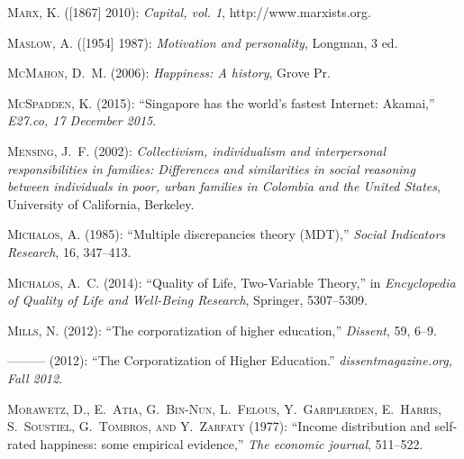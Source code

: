 \documentclass[10pt, letterpaper]{article}
\begin{document}
\begin{spacing}{2}
\begin{thebibliography}{120}
\textsc{Marx, K.} ([1867] 2010): \emph{Capital, vol. 1},
  http://www.marxists.org.

\textsc{Maslow, A.} ([1954] 1987): \emph{{Motivation and personality}},
  Longman, 3 ed.

\textsc{McMahon, D.~M.} (2006): \emph{Happiness: A history}, Grove Pr.

\textsc{McSpadden, K.} (2015): \enquote{Singapore has the world's fastest
  Internet: Akamai,} \emph{E27.co, 17 December 2015}.

\textsc{Mensing, J.~F.} (2002): \emph{Collectivism, individualism and
  interpersonal responsibilities in families: Differences and similarities in
  social reasoning between individuals in poor, urban families in Colombia and
  the United States}, University of California, Berkeley.

\textsc{Michalos, A.} (1985): \enquote{Multiple discrepancies theory (MDT),}
  \emph{Social Indicators Research}, 16, 347--413.

\textsc{Michalos, A.~C.} (2014): \enquote{Quality of Life, Two-Variable
  Theory,} in \emph{Encyclopedia of Quality of Life and Well-Being Research},
  Springer, 5307--5309.

\textsc{Mills, N.} (2012{}): \enquote{The corporatization of higher
  education,} \emph{Dissent}, 59, 6--9.

---\hspace{-.1pt}---\hspace{-.1pt}--- (2012{}): \enquote{The
  Corporatization of Higher Education.} \emph{dissentmagazine.org, Fall 2012}.

\textsc{Morawetz, D., E.~Atia, G.~Bin-Nun, L.~Felous, Y.~Gariplerden,
  E.~Harris, S.~Soustiel, G.~Tombros, and Y.~Zarfaty} (1977): \enquote{Income
  distribution and self-rated happiness: some empirical evidence,} \emph{The
  economic journal}, 511--522.


\end{thebibliography}
\end{spacing}
\end{document}
